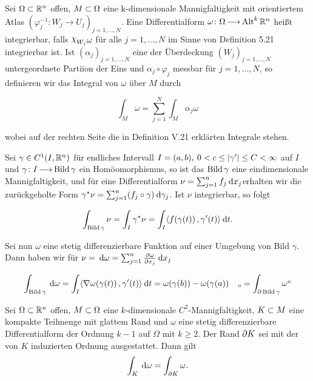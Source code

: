 \documentclass[skript.tex]{subfiles}
\begin{document}
		\begin{defin}
			Sei $ \Omega \subset {\mathbb{R}^n}$ offen, $M \subset \Omega$ eine k-dimensionale Mannigfaltigkeit mit orientiertem Atlas $(\varphi_j^{-1} \colon W_j \to U_j)_{j = 1, \dots, N}$. Eine Differentialform $\omega \colon \Omega \kern -1pt \longrightarrow \kern -1pt \operatorname{Alt}^k {\mathbb{R}^n}$ heißt integrierbar, falls $\rchi_{W_j} \omega$ für alle 
			$j = 1, \dots , N$ im Sinne von Definition 5.21 integrierbar ist. Ist $(\alpha_j)_{j=1, \dots, N}$ eine der Überdeckung $(W_j)_{j = 1, \dots, N}$ untergeordnete Partiion der Eins und $\alpha_j \circ \varphi_j$ messbar für $j = 1, \dots , N$, so definieren wir das Integral von $\omega$ über $M$ durch 
			
			\begin{equation*}
			\int_M \omega = \sum_{j=1}^{N} \int_M \alpha_j \omega
			\end{equation*}
			
			wobei auf der rechten Seite die in Definition V.21 erklärten Integrale stehen.
		\end{defin}
	
		\begin{bsp}[Kurvenintegrale]
			Sei $\gamma \in C^1(I, {\mathbb{R}^n})$ für endliches Intervall $I = (a,b), \: 0<c \leq \left| \gamma ' \right| \leq C < \infty$ auf $I$ und $ \gamma \colon I \kern -1pt \longrightarrow \kern -1pt \operatorname{Bild}\gamma$ ein Homöomorphismus, so ist das $\operatorname{Bild}\gamma$ eine eindimensionale Mannigfaltigkeit, und für eine Differentialform $\nu = \sum_{j=1}^{n} f_j \: \mathrm{d} x_j$erhalten wir die zurückgeholte Form $\gamma^* \nu = \sum_{j=1}^{n} (f_j \circ \gamma) \: \mathrm{d} \gamma_j$. Ist $\nu$ integrierbar, so folgt
			
			\begin{equation*}
			\int_{\operatorname{Bild} \gamma} \nu = \int_I \gamma^* \nu = \int_I \langle f(\gamma(t))\,{,}\,\gamma'(t) \rangle \: \mathrm{d} t.
			\end{equation*}
			
			Sei nun $\omega$ eine stetig differenzierbare Funktion auf einer Umgebung von Bild $\gamma$. Dann haben wir für $\nu = \: \mathrm{d} \omega= \sum_{j=1}^{n} \frac{\partial \omega}{\partial x_j} \: \mathrm{d} x_j$
			
			\begin{equation*}
			\int_{\operatorname{Bild}\gamma} \: \mathrm{d} \omega = \int_I \langle \nabla \omega( \gamma(t))\,{,}\,\gamma' (t) \rangle \: \mathrm{d} t = \omega(\gamma(b)) - \omega(\gamma(a)) \quad\text{„}= \int_{\partial \operatorname{Bild} \gamma} \omega\text{“}
			\end{equation*}
			
			\end{bsp}
			
			\begin{theorem}[Stokes]
				Sei $\Omega \subset {\mathbb{R}^n}$ offen, $M\subset\Omega$ eine $k$-dimensionale $C^2$-Mannigfaltigkeit, $K \subset M$ eine kompakte Teilmenge mit glattem Rand und $\omega$ eine stetig differenzierbare Differentialform der Ordnung $k-1$ auf $\Omega$ mit $k \geq 2$. Der Rand $\partial K$ sei mit der von $K$ induzierten Ordnung ausgestattet. Dann gilt
				\[
					\int_K \: \mathrm{d}\omega = \int_{\partial K} \omega.
				\]
			\end{theorem}
			
\end{document}
